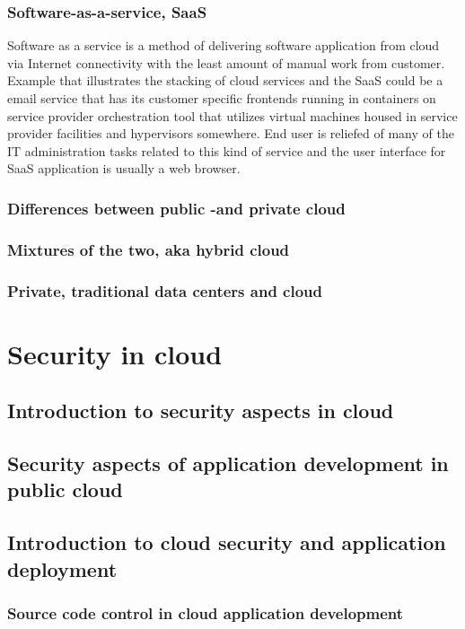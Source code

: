 \documentclass{article}
\begin{document}
\subsubsection{Software-as-a-service, SaaS}
Software as a service is a method of delivering software application from cloud via Internet connectivity with the least amount of manual work from customer.
Example that illustrates the stacking of cloud services and the SaaS could be a email service that has its customer specific frontends running in containers on service provider orchestration tool that utilizes virtual machines housed in service provider facilities  and hypervisors somewhere.
End user is reliefed of many of the IT administration tasks related to this kind of service and the user interface for SaaS application is usually a web browser.
\subsubsection{Differences between public -and private cloud}
\blindtext[2]
\subsubsection{Mixtures of the two, aka hybrid cloud}
\blindtext[2]
\subsubsection{Private, traditional data centers and cloud}
\blindtext[2]
\section{Security in cloud}
\blindtext[2]
\subsection{Introduction to security aspects in cloud}
\blindtext[2]
\subsection{Security aspects of application development in public cloud}
\blindtext[2]
\subsection{Introduction to cloud security and application deployment}
\blindtext[2]
\subsubsection{Source code control in cloud application development}
\blindtext[2]
\end{document}
